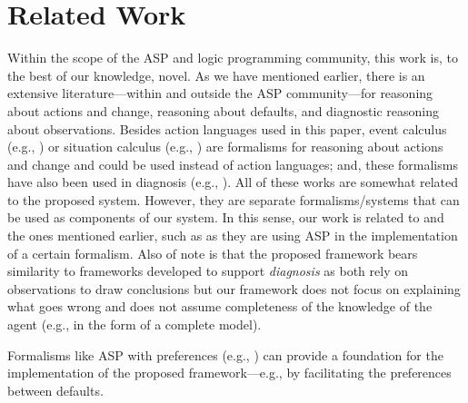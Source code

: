 \documentclass{article}
\newcommand{\memo}[1]{
  \ifthenelse {\boolean{includeMemo}}{\medskip\noindent\fbox{\begin{minipage}[b]{\dimexpr\linewidth-1em}#1\end{minipage}}\medskip\newline} 
}
\begin{document}
\section{Related Work }


Within the scope of the ASP and logic programming community, this work is, to the best of our knowledge,  novel. As we have mentioned earlier, there is an extensive literature---within and outside the ASP community---for reasoning about actions and change, reasoning about defaults, and diagnostic reasoning about observations. Besides action languages used in this paper, event calculus (e.g., \cite{KowalskiS86,den92a}) or situation calculus (e.g., \cite{McCarthyH69,Reiter01}) are formalisms for reasoning about actions and change and could be used instead of action languages; and, these formalisms have also been used in diagnosis (e.g., \cite{AriasCCG19,mci-th}). All of these works are somewhat related to the proposed system. However, they are separate formalisms/systems that can be used as components of our system. In this sense, our work is related to    \cite{BalducciniG03b,BalducciniG03} and the ones mentioned earlier, such as \cite{brew99,BrewkaE00,DelgrandeST03,GelfondS98} as they are using ASP  in the implementation of a certain formalism. Also of note is that the proposed framework bears  similarity  to frameworks developed to
support \emph{diagnosis} as both rely on observations to draw conclusions but our framework 
does not focus on explaining what goes wrong and does not assume completeness of the 
knowledge of the agent (e.g., in the form of a complete
model).   

Formalisms like ASP with preferences (e.g., \cite{Brewka05,BrewkaDRS15})  can provide a foundation for the implementation of the proposed framework---e.g., by 
facilitating the preferences between defaults.

\end{document}
